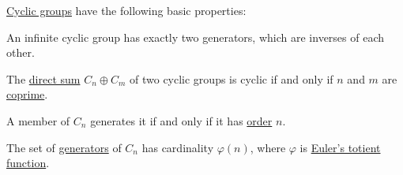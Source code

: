 \begin{proposition}\label{thm:def:cyclic_group}
  \hyperref[def:cyclic_group]{Cyclic groups} have the following basic properties:
  \begin{thmenum}
     An infinite cyclic group has exactly two generators, which are inverses of each other.

     The \hyperref[def:external_semimodule_direct_sum]{direct sum} \( C_n \oplus C_m \) of two cyclic groups is cyclic if and only if \( n \) and \( m \) are \hyperref[def:coprime_elements]{coprime}.

     A member of \( C_n \) generates it if and only if it has \hyperref[def:group_element_order]{order} \( n \).

     The set of \hyperref[def:group_presentation]{generators} of \( C_n \) has cardinality \( \varphi(n) \), where \( \varphi \) is \hyperref[def:eulers_totient_function]{Euler's totient function}.
  \end{thmenum}
\end{proposition}
